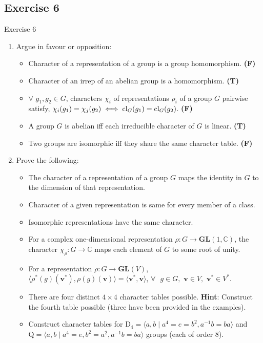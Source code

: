 \documentclass{beamer}
\begin{document}
\subsection{Exercise 6}

\begin{frame}{Exercise 6}
    \vspace{-0.2em}
    \begin{enumerate}
        \item Argue in favour or opposition:
        \vspace{-0.05em}
        \begin{itemize}
            \item Character of a representation of a group is a group homomorphism. \textbf{(F)}
            \item Character of an irrep of an abelian group is a homomorphism. \textbf{(T)}
            \item $\forall$ $g_1,g_2\in G$, characters $\chi_i$ of representations $\rho_i$ of a group $G$ pairwise satisfy, $\chi_{i}(g_1)= \chi_{j}(g_2)\iff\textup{cl}_G(g_1)=\textup{cl}_G(g_2)$. \textbf{(F)}
            \item A group $G$ is abelian iff each irreducible character of $G$ is linear. \textbf{(T)}
            \item Two groups are isomorphic iff they share the same character table. \textbf{(F)}
        \end{itemize}
        \item Prove the following:
        \vspace{-0.05em}
        \begin{itemize}
            \item The character of a representation of a group $G$ maps the identity in $G$ to the dimension of that representation.
            \item Character of a given representation is same for every member of a class.
            \item Isomorphic representations have the same character.
            \item For a complex one-dimensional representation $\rho:G\xrightarrow{}\mathbf{GL}(1,\mathbb{C})$, the character $\chi_\rho:G\xrightarrow{}\mathbb{C}$ maps each element of $G$ to some root of unity. 
            \item For a representation $\rho:G\xrightarrow{} \mathbf{GL}(V)$, $\langle \rho^*(g)(\mathbf{v}^*),\rho(g)(\mathbf{v})\rangle= \langle \mathbf{v}^*,\mathbf{v}\rangle$, $\forall\text{ }g\in G,$ $\mathbf{v}\in V,$ $\mathbf{v}^*\in V^*$.
            \item There are four distinct $4\times4$ character tables possible. \textbf{Hint}: Construct the fourth table possible (three have been provided in the examples).
            \item Construct character tables for $\text{D}_4=\langle a,b\mid a^4=e=b^2,a^{-1}b=ba\rangle$ and $\text{Q}=\langle a,b\mid a^4=e,b^2=a^2,a^{-1}b=ba\rangle$ groups (each of order 8).
        \end{itemize}
    \end{enumerate}
\end{frame}
\end{document}

